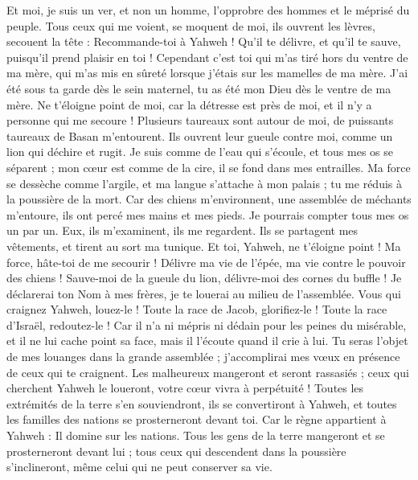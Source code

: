 \begin{multicols}{2}
Et moi, je suis un ver, et non un homme, l'opprobre des hommes et le méprisé du peuple.
Tous ceux qui me voient, se moquent de moi, ils ouvrent les lèvres, secouent la tête :
Recommande-toi à Yahweh ! Qu'il te délivre, et qu'il te sauve, puisqu'il prend plaisir en toi !
Cependant c'est toi qui m'as tiré hors du ventre de ma mère, qui m'as mis en sûreté lorsque j'étais sur les mamelles de ma mère.
J'ai été sous ta garde dès le sein maternel, tu as été mon Dieu dès le ventre de ma mère.
Ne t'éloigne point de moi, car la détresse est près de moi, et il n'y a personne qui me secoure !
Plusieurs taureaux sont autour de moi, de puissants taureaux de Basan m'entourent.
Ils ouvrent leur gueule contre moi, comme un lion qui déchire et rugit.
Je suis comme de l'eau qui s'écoule, et tous mes os se séparent ; mon cœur est comme de la cire, il se fond dans mes entrailles.
Ma force se dessèche comme l'argile, et ma langue s'attache à mon palais ; tu me réduis à la poussière de la mort.
Car des chiens m'environnent, une assemblée de méchants m'entoure, ils ont percé mes mains et mes pieds.
Je pourrais compter tous mes os un par un. Eux, ils m'examinent, ils me regardent.
Ils se partagent mes vêtements, et tirent au sort ma tunique.
Et toi, Yahweh, ne t'éloigne point ! Ma force, hâte-toi de me secourir !
Délivre ma vie de l'épée, ma vie contre le pouvoir des chiens !
Sauve-moi de la gueule du lion, délivre-moi des cornes du buffle !
Je déclarerai ton Nom à mes frères, je te louerai au milieu de l'assemblée.
Vous qui craignez Yahweh, louez-le ! Toute la race de Jacob, glorifiez-le ! Toute la race d'Israël, redoutez-le !
Car il n'a ni mépris ni dédain pour les peines du misérable, et il ne lui cache point sa face, mais il l'écoute quand il crie à lui.
Tu seras l'objet de mes louanges dans la grande assemblée ; j'accomplirai mes vœux en présence de ceux qui te craignent.
Les malheureux mangeront et seront rassasiés ; ceux qui cherchent Yahweh le loueront, votre cœur vivra à perpétuité !
Toutes les extrémités de la terre s'en souviendront, ils se convertiront à Yahweh, et toutes les familles des nations se prosterneront devant toi.
Car le règne appartient à Yahweh : Il domine sur les nations.
Tous les gens de la terre mangeront et se prosterneront devant lui ; tous ceux qui descendent dans la poussière s'inclineront, même celui qui ne peut conserver sa vie.

\end{multicols}
